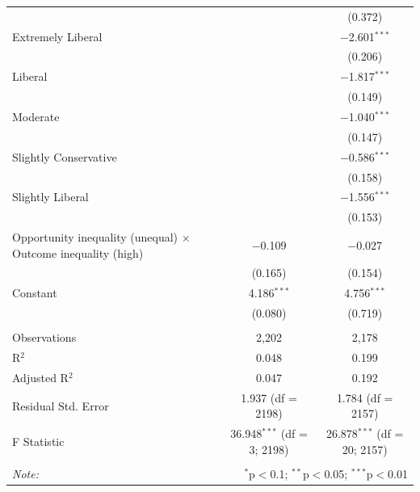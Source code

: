 \begin{table}[H]
\begin{tabular}{@{\extracolsep{5pt}}lcc}
  &  & (0.372) \\ 
  Extremely Liberal &  & $-$2.601$^{***}$ \\ 
  &  & (0.206) \\ 
  Liberal &  & $-$1.817$^{***}$ \\ 
  &  & (0.149) \\ 
  Moderate &  & $-$1.040$^{***}$ \\ 
  &  & (0.147) \\ 
  Slightly Conservative &  & $-$0.586$^{***}$ \\ 
  &  & (0.158) \\ 
  Slightly Liberal &  & $-$1.556$^{***}$ \\ 
  &  & (0.153) \\ 
  Opportunity inequality (unequal) × Outcome inequality (high) & $-$0.109 & $-$0.027 \\ 
  & (0.165) & (0.154) \\ 
  Constant & 4.186$^{***}$ & 4.756$^{***}$ \\ 
  & (0.080) & (0.719) \\ 
 \hline \\[-1.8ex] 
Observations & 2,202 & 2,178 \\ 
R$^{2}$ & 0.048 & 0.199 \\ 
Adjusted R$^{2}$ & 0.047 & 0.192 \\ 
Residual Std. Error & 1.937 (df = 2198) & 1.784 (df = 2157) \\ 
F Statistic & 36.948$^{***}$ (df = 3; 2198) & 26.878$^{***}$ (df = 20; 2157) \\ 
\hline 
\hline \\[-1.8ex] 
\textit{Note:}  & \multicolumn{2}{r}{$^{*}$p$<$0.1; $^{**}$p$<$0.05; $^{***}$p$<$0.01} \\ 
\end{tabular} 
\end{table} 
